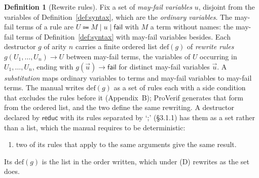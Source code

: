 \documentclass[11pt]{article}
\theoremstyle{definition}
\newtheorem{definition}{Definition}[section]
\theoremstyle{plain}
\theoremstyle{remark}
\begin{document}
\begin{definition}[Rewrite rules]\label{def:rewrite}
Fix a set of \emph{may-fail variables} $u$, disjoint from the variables of Definition~\ref{def:syntax}, which are the \emph{ordinary variables}. The may-fail terms of a rule are $U\Coloneqq M\mid u\mid\mathsf{fail}$ with $M$ a term without names: the may-fail terms of Definition~\ref{def:syntax} with may-fail variables besides. Each destructor $g$ of arity $n$ carries a finite ordered list $\mathrm{def}(g)$ of \emph{rewrite rules} $g(U_1,\dots,U_n)\to U$ between may-fail terms, the variables of $U$ occurring in $U_1,\dots,U_n$, ending with $g(\vec u)\to\mathsf{fail}$ for distinct may-fail variables $\vec u$. A \emph{substitution} maps ordinary variables to terms and may-fail variables to may-fail terms. The manual writes $\mathrm{def}(g)$ as a set of rules each with a side condition that excludes the rules before it (Appendix~B); ProVerif generates that form from the ordered list, and the two define the same rewriting. A destructor declared by $\mathsf{reduc}$ with its rules separated by `;' (\S3.1.1) has them as a set rather than a list, which the manual requires to be deterministic:
\begin{enumerate}
\item[(D)] two of its rules that apply to the same arguments give the same result.
\end{enumerate}
Its $\mathrm{def}(g)$ is the list in the order written, which under (D) rewrites as the set does.
\end{definition}
\end{document}
